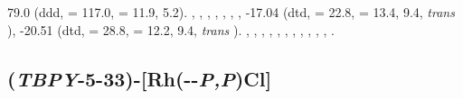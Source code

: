 79.0 (ddd, \JRhP{} = 117.0, \JPH{} = 11.9, 5.2).
,
,
,
,
,
,
,
-17.04 (dtd, \JRhH{} = 22.8, \JPH{} = 13.4, \JHH{} 9.4,  \emph{trans} ),
-20.51 (dtd, \JRhH{} = 28.8, \JPH{} = 12.2, \JHH{} 9.4,  \emph{trans} ).
,
,
,
,
,
,
,
,
,
,
,
.

%
%
%
%


\subsection*{(\emph{TBPY}-5-33)-[Rh(\tBusixantphos--\emph{P,P}\textprime)Cl]}



